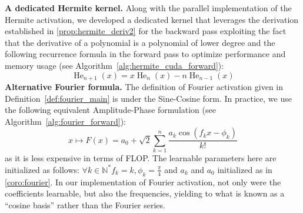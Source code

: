\documentclass{article} %
\theoremstyle{plain}
\theoremstyle{definition}
\theoremstyle{remark}
\begin{document}
\textbf{A dedicated Hermite kernel.}
\label{hermite_rec}
Along with the parallel implementation of the Hermite activation, we developed a dedicated kernel that leverages the derivation established in \ref{prop:hermite_deriv2} for the backward pass exploiting the fact that the derivative of a polynomial is a polynomial of lower degree  and the following recurrence formula in the forward pass to optimize performance and memory usage (see Algorithm~\ref{alg:hermite_cuda_forward}):
\begin{equation}
\label{eq:hermite_rec}
    {\displaystyle\operatorname {He} _{n+1}(x) =x\operatorname {He} _{n}(x)-n\operatorname {He} _{n-1}(x)}
\end{equation}
\textbf{Alternative Fourier formula.} The definition of Fourier activation given in Definition~\ref{def:fourier_main} is under the Sine-Cosine form. In practice, we use the following equivalent Amplitude-Phase formulation (see Algorithm~\ref{alg:fourier_forward}):
\begin{equation}
    x \mapsto F(x) = a_0 + \sqrt2\sum_{k=1}^{n} \frac{a_k \cos(f_k x - \phi_k)}{k!}
\end{equation}
as it is less expensive in terms of FLOP. The learnable parameters here are initialized as follows: $\forall k \in \mathbb{N}^* f_k = k, \phi_k = \frac{\pi}{4}$ and $a_k$ and $a_0$ initialized as in \ref{coro:fourier}.
In our implementation of Fourier activation, not only were the coefficients learnable, but also the frequencies, yielding to what is known as a ``cosine basis'' \cite{mallat2009wavelet} rather than the Fourier series.
\end{document}
